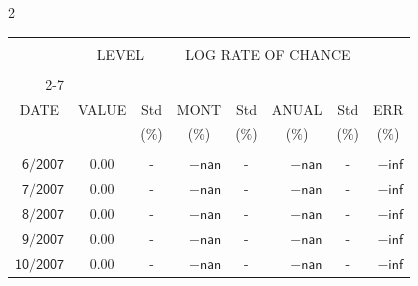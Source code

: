 \begin{multicols}{2}{ 
\begin{tabular}{rccrcrcr} 
\hline 
 \multicolumn{1}{|c|}{}  &  \multicolumn{2}{c|}{} & 
\multicolumn{4}{c}{} & \multicolumn{1}{|c|}{}\vspace{-.10in}\\ 
\multicolumn{1}{|c|}{}  &  \multicolumn{2}{c|}{LEVEL} & 
\multicolumn{4}{c}{LOG RATE OF CHANCE} & \multicolumn{1}{|c|}{}    \\  
\multicolumn{1}{|c|}{}  &  \multicolumn{2}{c|}{} & 
\multicolumn{4}{c}{} & \multicolumn{1}{|c|}{}\vspace{-.10in}\\ \cline{2-7} 
\multicolumn{1}{|c|}{ } &\multicolumn{1}{c|}{ } & \multicolumn{1}{c|}{} & \multicolumn{1}{c|}{} & \multicolumn{1}{c|}{}     & \multicolumn{1}{c|}{} & \multicolumn{1}{c|}{}  & \multicolumn{1}{c|}{}  \vspace{-.05in}\\  
\multicolumn{1}{|c|}{DATE } &\multicolumn{1}{c|}{ VALUE} & \multicolumn{1}{c|}{Std} & \multicolumn{1}{c|}{MONT} & \multicolumn{1}{c|}{Std}     & \multicolumn{1}{c|}{ANUAL} & \multicolumn{1}{c|}{Std}  & \multicolumn{1}{c|}{ERR}\\  
\multicolumn{1}{|c|}{ }      & \multicolumn{1}{c|}{  }    & \multicolumn{1}{c|}{($\%$)}&  \multicolumn{1}{c|}{($\%$)  }  & \multicolumn{1}{c|}{($\%$)} & \multicolumn{1}{c|}{($\%$) }     & \multicolumn{1}{c|}{ ($\%$) }  &  \multicolumn{1}{c|}{ ($\%$) } \\  
 \hline 
 \\$\mathsf{       6/2007}$ &$\mathsf{     0.00}$ &     - &$\mathsf{    -nan}$ &     - &$\mathsf{     -nan }$ &     - &$\mathsf{   -inf} $ \vspace{-.005in}\\ 
$\mathsf{       7/2007}$ &$\mathsf{     0.00}$ &     - &$\mathsf{    -nan}$ &     - &$\mathsf{     -nan }$ &     - &$\mathsf{   -inf} $ \vspace{-.005in}\\ 
$\mathsf{       8/2007}$ &$\mathsf{     0.00}$ &     - &$\mathsf{    -nan}$ &     - &$\mathsf{     -nan }$ &     - &$\mathsf{   -inf} $ \vspace{-.005in}\\ 
$\mathsf{       9/2007}$ &$\mathsf{     0.00}$ &     - &$\mathsf{    -nan}$ &     - &$\mathsf{     -nan }$ &     - &$\mathsf{   -inf} $ \vspace{-.005in}\\ 
$\mathsf{      10/2007}$ &$\mathsf{     0.00}$ &     - &$\mathsf{    -nan}$ &     - &$\mathsf{     -nan }$ &     - &$\mathsf{   -inf} $ \vspace{-.005in}\\ 

\end{tabular}}
\end{multicols}
